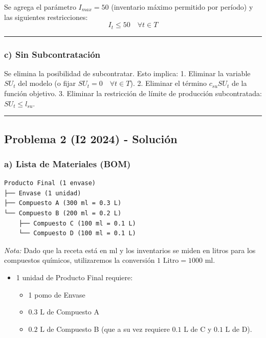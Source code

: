 \documentclass[
]{article}
\providecommand{\tightlist}{%
  \setlength{\itemsep}{0pt}\setlength{\parskip}{0pt}}
\begin{document}
Se agrega el parámetro \(I_{max} = 50\) (inventario máximo permitido por
período) y las siguientes restricciones:
\[I_t \le 50 \quad \forall t \in T\]

\begin{center}\rule{0.5\linewidth}{0.5pt}\end{center}

\hypertarget{c-sin-subcontrataciuxf3n}{%
\subsubsection{c) Sin Subcontratación}\label{c-sin-subcontrataciuxf3n}}

Se elimina la posibilidad de subcontratar. Esto implica: 1. Eliminar la
variable \(SU_t\) del modelo (o fijar
\(SU_t = 0 \quad \forall t \in T\)). 2. Eliminar el término
\(c_{su} SU_t\) de la función objetivo. 3. Eliminar la restricción de
límite de producción subcontratada: \(SU_t \le l_{su}\).

\begin{center}\rule{0.5\linewidth}{0.5pt}\end{center}

\hypertarget{problema-2-i2-2024---soluciuxf3n}{%
\subsection{Problema 2 (I2 2024) -
Solución}\label{problema-2-i2-2024---soluciuxf3n}}

\hypertarget{a-lista-de-materiales-bom}{%
\subsubsection{a) Lista de Materiales
(BOM)}\label{a-lista-de-materiales-bom}}

\begin{verbatim}
Producto Final (1 envase)
├── Envase (1 unidad)
├── Compuesto A (300 ml = 0.3 L)
└── Compuesto B (200 ml = 0.2 L)
    ├── Compuesto C (100 ml = 0.1 L)
    └── Compuesto D (100 ml = 0.1 L)
\end{verbatim}

\emph{Nota:} Dado que la receta está en ml y los inventarios se miden en
litros para los compuestos químicos, utilizaremos la conversión
\(1\text{ Litro} = 1000\text{ ml}\).

\begin{itemize}
\tightlist
\item
  1 unidad de Producto Final requiere:

  \begin{itemize}
  \tightlist
  \item
    1 pomo de Envase
  \item
    \(0.3\text{ L}\) de Compuesto A
  \item
    \(0.2\text{ L}\) de Compuesto B (que a su vez requiere
    \(0.1\text{ L}\) de C y \(0.1\text{ L}\) de D).
  \end{itemize}
\end{itemize}
\end{document}
